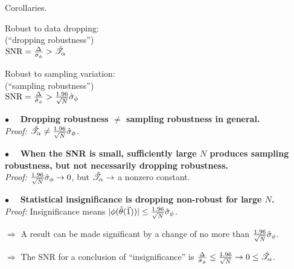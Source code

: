 \begin{frame}[t]{Corollaries.}
%
\begin{minipage}{0.45\textwidth}
\begin{center}
    Robust to data dropping:\\
    (``dropping robustness'')\\
    \vspace{1em}
    $\textrm{SNR} = \frac{\Delta}{\hat\sigma_{\phi}} > \hat{\mathscr{T}}_\alpha$
\end{center}
\end{minipage}
%
\begin{minipage}{0.45\textwidth}
\begin{center}
    Robust to sampling variation:\\
    (``sampling robustness'')\\
    \vspace{1em}
    $\textrm{SNR} = \frac{\Delta}{\hat\sigma_{\phi}} >
        \frac{1.96}{\sqrt{N}} \hat\sigma_{\phi}$
\end{center}
\end{minipage}

\vspace{1em}

\hrulefill

\vspace{1em} $\bullet\quad$
\textbf{Dropping robustness $\ne$ sampling robustness in general.\\}
\textit{Proof: }
$\hat{\mathscr{T}}_\alpha \ne \frac{1.96}{\sqrt{N}} \hat\sigma_{\phi}$.

\vspace{1em} $\bullet\quad$
\textbf{When the SNR is small, sufficiently large $N$
produces sampling robustness, but not necessarily
dropping robustness.\\}
\textit{Proof: }
$\frac{1.96}{\sqrt{N}} \hat\sigma_{\phi} \rightarrow 0$, but $\hat{\mathscr{T}}_\alpha \rightarrow$ a nonzero
constant.

\vspace{1em} $\bullet\quad$
\textbf{Statistical insignificance is dropping non-robust for large $N$.\\}
\textit{Proof: }
%
Insignificance means
$|\phi(\hat{\theta}(\vec{1}))| \le \frac{1.96}{\sqrt{N}} \hat\sigma_{\phi}$.

$\Rightarrow$ A result can be made significant by a change of no more than
$\frac{1.96}{\sqrt{N}} \hat\sigma_{\phi}$.

$\Rightarrow$ The SNR for a conclusion
of ``insignificance'' is $\frac{\Delta}{\hat\sigma_{\phi}} \le \frac{1.96}{\sqrt{N}}
\rightarrow 0 \le \hat{\mathscr{T}}_\alpha$.

\end{frame}



